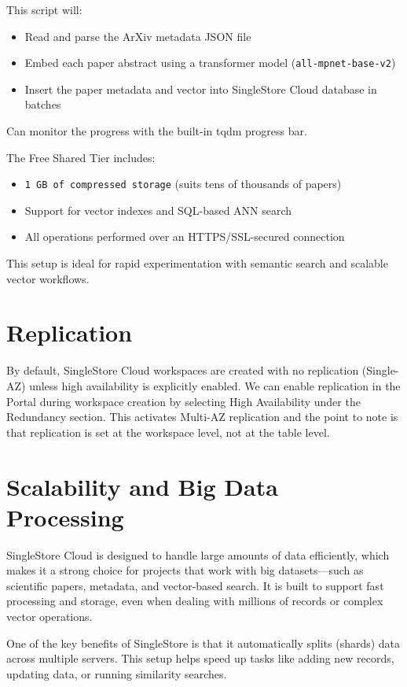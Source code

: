 \documentclass[11pt]{article}
\begin{document}
This script will:
\begin{itemize}
\item Read and parse the ArXiv metadata JSON file
\item Embed each paper abstract using a transformer model (\texttt{all-mpnet-base-v2})
\item Insert the paper metadata and vector into SingleStore Cloud database in batches
\end{itemize}

Can monitor the progress with the built-in tqdm progress bar.

The Free Shared Tier includes:
\begin{itemize}
\item \texttt{1 GB of compressed storage} (suits tens of thousands of papers)
\item Support for vector indexes and SQL-based ANN search
\item All operations performed over an HTTPS/SSL-secured connection
\end{itemize}

This setup is ideal for rapid experimentation with semantic search and scalable vector workflows.
\section{Replication}
\label{sec:org21af4f3}

By default, SingleStore Cloud workspaces are created with no replication (Single-AZ) unless high availability is explicitly enabled. We can enable replication in the Portal during workspace creation by selecting High Availability under the Redundancy section. This activates Multi-AZ replication and the point to note is that replication is set at the workspace level, not at the table level.
\section{Scalability and Big Data Processing}
\label{sec:org59baf8b}

SingleStore Cloud is designed to handle large amounts of data efficiently, which makes it a strong choice for projects that work with big datasets—such as scientific papers, metadata, and vector-based search. It is built to support fast processing and storage, even when dealing with millions of records or complex vector operations.

One of the key benefits of SingleStore is that it automatically splits (shards) data across multiple servers. This setup helps speed up tasks like adding new records, updating data, or running similarity searches.
\end{document}
